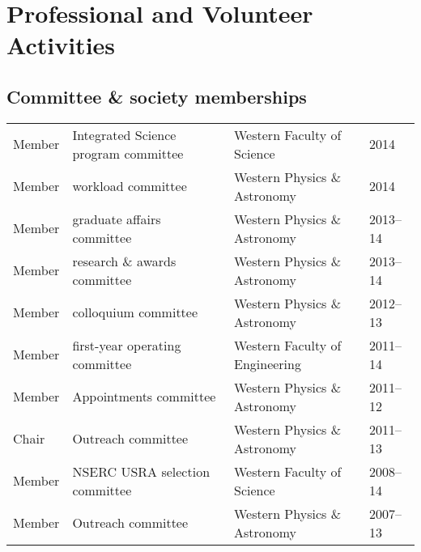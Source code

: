 \documentclass[12pt]{article}
\begin{document}
\section{Professional and Volunteer Activities}

\subsection{Committee \& society memberships}
\begin{tabular}{p{1.5cm}lll}
Member& Integrated Science program committee&  Western Faculty of Science& 2014\\
Member& workload committee&  Western Physics \& Astronomy& 2014\\
Member& graduate affairs committee&  Western Physics \& Astronomy& 2013--14\\
Member& research \& awards committee&  Western Physics \& Astronomy& 2013--14\\
Member& colloquium committee& Western Physics \& Astronomy& 2012--13\\
Member& first-year operating committee& Western Faculty of Engineering &  2011--14\\
Member & Appointments committee& Western Physics \& Astronomy& 2011--12\\
Chair& Outreach committee& Western Physics \& Astronomy& 2011--13\\
Member&  NSERC USRA selection committee& Western Faculty of Science& 2008--14\\
Member&  Outreach committee& Western Physics \& Astronomy& 2007--13\\
\end{tabular}
\end{document}
